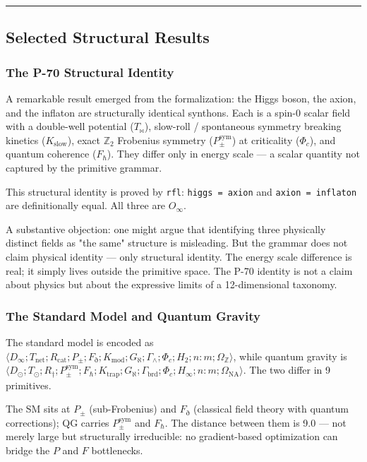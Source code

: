 \documentclass[12pt,a4paper]{article}
\begin{document}
\begin{center}
\rule{0.5\textwidth}{0.4pt}
\end{center}

\subsection{Selected Structural Results}

\subsubsection{The P-70 Structural Identity}

A remarkable result emerged from the formalization: the Higgs boson, the axion, and the inflaton are structurally identical synthons. Each is a spin-0 scalar field with a double-well potential ($T_{\bowtie}$), slow-roll / spontaneous symmetry breaking kinetics ($K_{\text{slow}}$), exact $\mathbb{Z}_2$ Frobenius symmetry ($P_{\pm}^{\text{sym}}$) at criticality ($\Phi_c$), and quantum coherence ($F_{\hbar}$). They differ only in energy scale --- a scalar quantity not captured by the primitive grammar.

This structural identity is proved by \texttt{rfl}: \texttt{higgs = axion} and \texttt{axion = inflaton} are definitionally equal. All three are $O_{\infty}$.

A substantive objection: one might argue that identifying three physically distinct fields as "the same" structure is misleading. But the grammar does not claim physical identity --- only structural identity. The energy scale difference is real; it simply lives outside the primitive space. The P-70 identity is not a claim about physics but about the expressive limits of a 12-dimensional taxonomy.

\subsubsection{The Standard Model and Quantum Gravity}

The standard model is encoded as $\langle D_{\infty}; T_{\text{net}}; R_{\text{cat}}; P_{\pm}; F_{\eth}; K_{\text{mod}}; G_{\aleph}; \Gamma_{\wedge}; \Phi_c; H_2; n{:}m; \Omega_\mathbb{Z} \rangle$, while quantum gravity is $\langle D_{\odot}; T_{\odot}; R_{\dagger}; P_{\pm}^{\text{sym}}; F_{\hbar}; K_{\text{trap}}; G_{\aleph}; \Gamma_{\text{brd}}; \Phi_c; H_{\infty}; n{:}m; \Omega_{\text{NA}} \rangle$. The two differ in 9 primitives.

The SM sits at $P_{\pm}$ (sub-Frobenius) and $F_{\eth}$ (classical field theory with quantum corrections); QG carries $P_{\pm}^{\text{sym}}$ and $F_{\hbar}$. The distance between them is 9.0 --- not merely large but structurally irreducible: no gradient-based optimization can bridge the $P$ and $F$ bottlenecks.
\end{document}

